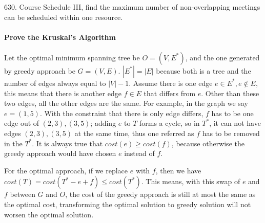 \documentclass[../main.tex]{subfiles}
\begin{document}
\begin{bclogo}[couleur = blue!30, arrondi=0.1,logo=\bccrayon,ombre=true]{630. Course Schedule III, find the maximum number of non-overlapping meetings can be scheduled within one resource. } 
\end{bclogo}

\paragraph{Prove the Kruskal's Algorithm} Let the optimal minimum spanning tree be $O = (V, E^{*})$, and the one generated by greedy approach be $G=(V, E)$. $|E^{*}|=|E|$ because both is a tree and the number of edges always equal to $|V|-1$. Assume there is one edge $e\in E^{*}, e\not \in E$, this means that there is another edge $f \in E$ that differs from $e$. Other than these two edges, all the other edges are the same.  For example, in the graph we say $e=(1,5)$. With the constraint that there is only edge differs, $f$ has to be one edge out of $(2, 3), (3, 5)$; adding $e$ to $T$ forms a cycle, so in $T^{*}$, it can not have edges $(2, 3), (3, 5)$ at the same time, thus one referred as $f$ has to be removed in the $T^{*}$.  It is always true that $cost(e)\geq cost(f)$, because otherwise the greedy approach would have chosen $e$ instead of $f$.

For the optimal approach, if we replace $e$ with $f$, then we have $cost(T) =cost(T^{*}-e+f) \leq cost(T^{*})$. This means, with this swap of $e$ and $f$ between $G$ and $O$, the cost of the greedy approach is still at most the same as the optimal cost, transforming the optimal solution to greedy solution will not worsen the optimal solution. 
\end{document}
